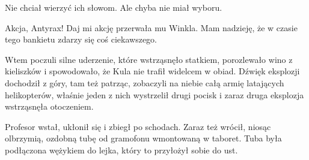 Nie chciał wierzyć ich słowom. Ale chyba nie miał wyboru.

\divider{} 

\begin{dialogue}
\ds{} Akcja, Antyrax! Daj mi akcję \dm{} przerwała mu Winkla. \dm{} Mam nadzieję, że w czasie tego bankietu zdarzy się coś ciekawszego.
\end{dialogue}

\divider{}

Wtem poczuli silne uderzenie, które wstrząsnęło statkiem, porozlewało wino z kieliszków i spowodowało, że Kula nie trafił widelcem w obiad.
Dźwięk eksplozji dochodził z góry, tam też patrząc, zobaczyli na niebie całą armię latających helikopterów, właśnie jeden z nich wystrzelił drugi pocisk i zaraz druga eksplozja wstrząsnęła otoczeniem.

Profesor wstał, ukłonił się i zbiegł po schodach. Zaraz też wrócił, niosąc olbrzymią, ozdobną tubę od gramofonu wmontowaną w taboret. Tuba była podłączona wężykiem do lejka, który to przyłożył sobie do ust.


